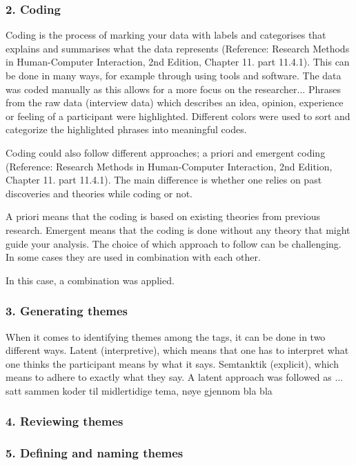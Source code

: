     \subsubsection{2. Coding}
    Coding is the process of marking your data with labels and categorises that explains and summarises what the data represents (Reference: Research Methods in Human-Computer Interaction, 2nd Edition, Chapter 11. part 11.4.1). This can be done in many ways, for example through using tools and software. The data was coded manually as this allows for a more focus on the researcher... Phrases from the raw data (interview data) which describes an idea, opinion, experience or feeling of a participant were highlighted. Different colors were used to sort and categorize the highlighted phrases into meaningful codes.
    
    Coding could also follow different approaches; a priori and emergent coding (Reference: Research Methods in Human-Computer Interaction, 2nd Edition, Chapter 11. part 11.4.1). The main difference is whether one relies on past discoveries and theories while coding or not.
    
    A priori means that the coding is based on existing theories from previous research. 
    Emergent means that the coding is done without any theory that might guide your analysis. 
    The choice of which approach to follow can be challenging. In some cases they are used in combination with each other. 
    
    In this case, a combination was applied. 
    
    \subsubsection{3. Generating themes}
    
    When it comes to identifying themes among the tags, it can be done in two different ways. Latent (interpretive), which means that one has to interpret what one thinks the participant means by what it says. Semtanktik (explicit), which means to adhere to exactly what they say. A latent approach was followed as ...
    satt sammen koder til midlertidige tema, nøye gjennom bla bla 

    \subsubsection{4. Reviewing themes}
    \subsubsection{5. Defining and naming themes}

